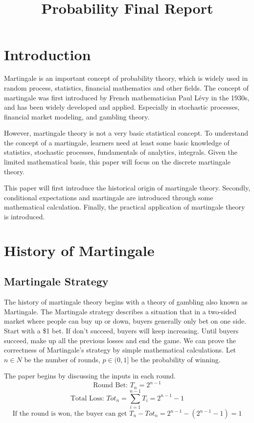 \documentclass[11pt]{article} %
\title{Probability Final Report}
\date{}
\begin{document}
\maketitle
\section{Introduction}
Martingale is an important concept of probability theory, which is widely used in random process, statistics, financial mathematics and other fields. The concept of martingale was first introduced by French mathematician Paul Lévy in the 1930s, and has been widely developed and applied. Especially in stochastic processes, financial market modeling, and gambling theory.

However, martingale theory is not a very basic statistical concept. To understand the concept of a martingale, learners need at least some basic knowledge of statistics, stochastic processes, fundamentals of analytics, integrals. Given the limited mathematical basis, this paper will focus on the discrete martingale theory.

This paper will first introduce the historical origin of martingale theory. Secondly, conditional expectations and martingale are introduced through some mathematical calculation. Finally, the practical application of martingale theory is introduced.

\section{History of Martingale}
\subsection{Martingale Strategy}
The history of martingale theory begins with a theory of gambling also known as Martingale. The Martingale strategy describes a situation that in a two-sided market where people can buy up or down, buyers generally only bet on one side. Start with a \$1 bet. If don't succeed, buyers will keep increasing. Until buyers succeed, make up all the previous losses and end the game. We can prove the correctness of Martingale's strategy by simple mathematical calculations.
Let $n \in N$ be the number of rounds, $p\in(0,1]$ be the probability of winning.

The paper begins by discussing the inputs in each round.
$$
\text{Round Bet: }T_n = 2^{n-1}
$$
$$
\text{Total Loss: } Tot_n = \sum_{i = 1}^{n-1}T_i = 2^{n-1}-1
$$
$$
\text {If the round is won, the buyer can get }T_n-Tot_n = 2^{n-1}- (2^{n-1}-1) = 1
$$
\end{document}
